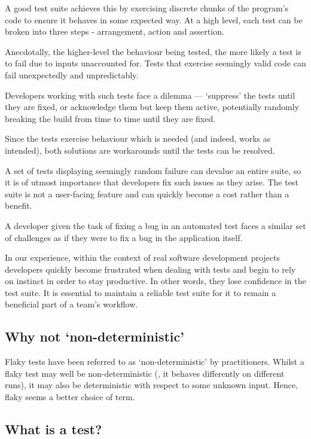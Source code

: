 A good test suite achieves this by exercising discrete chunks of the program's
code to ensure it behaves in some expected way. At a high level, each test can
be broken into three steps - arrangement, action and assertion.

Anecdotally, the higher-level the behaviour being tested, the more likely a test
is to fail due to inputs unaccounted for. Tests that exercise seemingly valid
code can fail unexpectedly and unpredictably.

Developers working with such tests face a dilemma --- {\lq}suppress{\rq} the
tests until they are fixed, or acknowledge them but keep them active,
potentially randomly breaking the build from time to time until they are fixed.

Since the tests exercise behaviour which is needed (and indeed, works as
intended), both solutions are workarounds until the tests can be resolved.

A set of tests displaying seemingly random failure can devalue an entire suite,
so it is of utmost importance that developers fix such issues as they arise.
The test suite is not a user-facing feature and can quickly become a cost
rather than a benefit.

A developer given the task of fixing a bug in an automated test faces a similar
set of challenges as if they were to fix a bug in the application itself.

In our experience, within the context of real software development projects
developers quickly become frustrated when dealing with \flaky tests and begin to
rely on instinct in order to stay productive. In other words, they lose
confidence in the test suite. It is essential to maintain a reliable test suite
for it to remain a beneficial part of a team's workflow.


\subsection{Why not {\lq}non-deterministic{\rq}}

Flaky tests have been referred to as {\lq}non-deterministic{\rq} by
practitioners. Whilst a flaky test may well be non-deterministic (\ie, it
behaves differently on different runs), it may also be deterministic with
respect to some unknown input. Hence, flaky seems a better choice of term.


\subsection{What is a \flaky test?}

